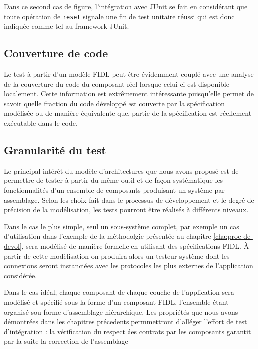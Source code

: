 Dans ce second cas de figure, l'int\'egration avec JUnit se fait en
consid\'erant que toute op\'eration de \texttt{reset} signale une
fin de test unitaire r\'eussi qui est donc indiqu\'ee comme tel au
framework \textsf{JUnit}.

\subsection{Couverture de code}

Le test \`a partir d'un mod\`ele \textsf{FIDL} peut \^etre
\'evidemment coupl\'e avec une analyse de la couverture du code du
composant r\'eel lorsque celui-ci est disponible localement. Cette
information est extr\^emement int\'eressante puisqu'elle permet de
savoir quelle fraction du code d\'evelopp\'e est couverte par la
sp\'ecification mod\'elis\'ee ou de mani\`ere \'equivalente quel
partie de la sp\'ecification est r\'eellement ex\'ecutable dans le
code. 

\subsection{Granularit\'e du test}

Le principal int\'er\^et du mod\`ele d'architectures que nous avons
propos\'e est de permettre de tester \`a partir du m\^eme outil et
de fa\c{c}on syst\'ematique les fonctionnalit\'es d'un ensemble de
composants produisant un syst\`eme par assemblage. Selon les choix
fait dans le processus de d\'eveloppement et le degr\'e de
pr\'ecision de la mod\'elisation, les tests pourront \^etre
r\'ealis\'es \`a diff\'erents niveaux. 

Dans le cas le plus simple, seul un sous-syst\`eme complet, par exemple un
cas d'utilisation dans l'exemple de la m\'ethodolgie pr\'esent\'ee
au chapitre \ref{cha:proc-de-devol}, sera mod\'elis\'e de mani\`ere
formelle en utilisant des sp\'ecifications \textsf{FIDL}. \`A partir
de cette mod\`elisation on produira alors un  testeur syst\`eme
dont les connexions seront instanci\'ees avec les protocoles les plus
externes de l'application consid\'er\'ee. 

Dans le cas id\'eal, chaque composant de chaque couche de
l'application sera mod\'elis\'e et sp\'ecifi\'e sous la forme d'un
composant FIDL, l'ensemble \'etant organis\'e sou forme d'assemblage
hi\'erarchique. Les propri\'et\'es que nous avons d\'emontr\'ees
dans les chapitres pr\'ecedents permmettront d'all\'eger l'effort de
test d'int\'egration : la v\'erification du respect des contrats par
les composants garantit par la suite la correction de l'assemblage.

